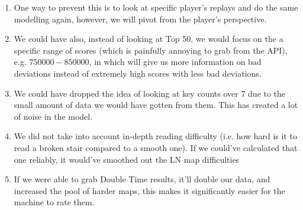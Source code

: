 \begin{enumerate}
	\item One way to prevent this is to look at specific player's replays and do the same modelling again, however, we will pivot from the player's perspective.
	\item We could have also, instead of looking at Top 50, we would focus on the a specific range of scores (which is painfully annoying to grab from the API), e.g. $ 750000 - 850000$, in which will give us more information on bad deviations instead of  extremely high scores with less bad deviations.
	\item We could have dropped the idea of looking at key counts over 7 due to the small amount of data we would have gotten from them. This has created a lot of noise in the model. 
	\item We did not take into account in-depth reading difficulty (i.e. how hard is it to read a broken stair compared to a smooth one). If we could've calculated that one reliably, it would've smoothed out the LN map difficulties
	\item If we were able to grab Double Time results, it'll double our data, and increased the pool of harder maps, this makes it significantly easier for the machine to rate them.
\end{enumerate}


